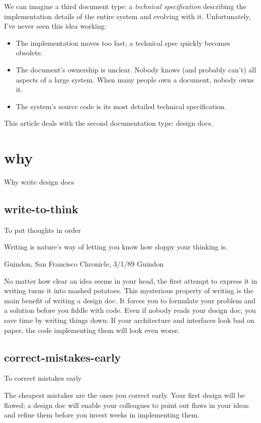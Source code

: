 \documentclass{article}
\begin{document}
We can imagine a third document type: a \emph{technical specification} describing the implementation details of the entire system and evolving with it.
Unfortunately, I've never seen this idea working:
\begin{itemize}
\item
  The implementation moves too fast; a technical spec quickly becomes obsolete.
\item The document's ownership is unclear.
  Nobody knows (and probably can't) all aspects of a large system.
  When many people own a document, nobody owns it.
\item
  The system's source code is its most detailed technical specification.
\end{itemize}

This article deals with the second documentation type: design docs.

\section{why}{Why write design docs}

\subsection{write-to-think}{To put thoughts in order}

\epigraph{
  Writing is nature's way of letting you know how sloppy your thinking is.
}{Guindon, San Francisco Chronicle, 3/1/89 Guindon}

No matter how clear an idea seems in your head, the first attempt to express it in writing turns it into mashed potatoes.
This mysterious property of writing is the main benefit of writing a design doc.
It forces you to formulate your problem and a solution before you fiddle with code.
Even if nobody reads your design doc, you save time by writing things down:
If your architecture and interfaces look bad on paper, the code implementing them will look even worse.

\subsection{correct-mistakes-early}{To correct mistakes early}

The cheapest mistakes are the ones you correct early.
Your first design will be flawed;
a design doc will enable your colleagues to point out flaws in your ideas and refine them before you invest weeks in implementing them.
\end{document}
